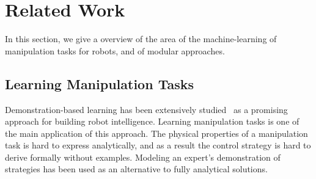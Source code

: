 \section{Related Work}
\label{sec:related}
In this section, we give a overview of the area of the
machine-learning of manipulation tasks for robots, and of modular
approaches.



\subsection{Learning Manipulation Tasks}
Demonstration-based learning has been extensively
studied~\citep{calinon2007learning,dillmann2004teaching,kulic2012incremental}
as a promising approach for building robot
intelligence. %
Learning manipulation tasks is one of the main application of this
approach. The physical properties of a manipulation task is hard to
express analytically, and as a result the control strategy is hard to
derive formally without examples. Modeling an expert's demonstration
of strategies has been used as an alternative to fully analytical
solutions.

